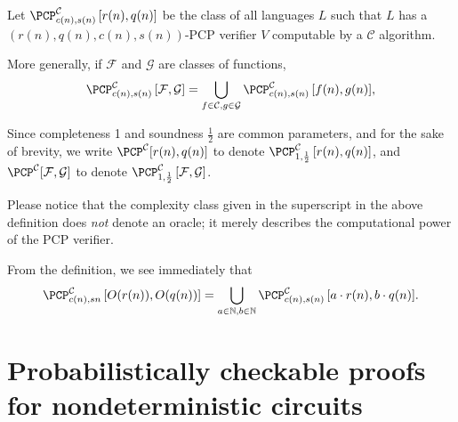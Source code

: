 \documentclass{article}
\newcommand{\PCPcs}[5]{\PCP^{#1}_{#2, #3}\left[#4, #5\right]}
\begin{document}
\begin{definition}
  Let $\PCPcs{\mathcal{C}}{c(n)}{s(n)}{r(n)}{q(n)}$ be the class of all languages $L$ such that $L$ has a $(r(n), q(n), c(n), s(n))$-PCP verifier $V$ computable by a $\mathcal{C}$ algorithm.

  More generally, if $\mathcal{F}$ and $\mathcal{G}$ are classes of functions,
  \begin{equation*}
    \PCPcs{\mathcal{C}}{c(n)}{s(n)}{\mathcal{F}}{\mathcal{G}} = \bigcup_{f \in \mathcal{C}, g \in \mathcal{G}}{\PCPcs{\mathcal{C}}{c(n)}{s(n)}{f(n)}{g(n)}},
    \end{equation*}

  Since completeness 1 and soundness $\frac{1}{2}$ are common parameters, and for the sake of brevity, we write $\PCP^{\mathcal{C}}[r(n), q(n)]$ to denote $\PCPcs{\mathcal{C}}{1}{\frac{1}{2}}{r(n)}{q(n)}$, and $\PCP^{\mathcal{C}}[\mathcal{F}, \mathcal{G}]$ to denote $\PCPcs{\mathcal{C}}{1}{\frac{1}{2}}{\mathcal{F}}{\mathcal{G}}$.
\end{definition}

Please notice that the complexity class given in the superscript in the above definition does \emph{not} denote an oracle; it merely describes the computational power of the PCP verifier.

From the definition, we see immediately that
\begin{equation*}
  \PCPcs{\mathcal{C}}{c(n)}{s{n}}{O(r(n))}{O(q(n))} = \bigcup_{a \in \mathbb{N}, b \in \mathbb{N}}{\PCPcs{\mathcal{C}}{c(n)}{s(n)}{a \cdot r(n)}{b \cdot q(n)}}.
\end{equation*}

\section{Probabilistically checkable proofs for nondeterministic circuits}
\end{document}
